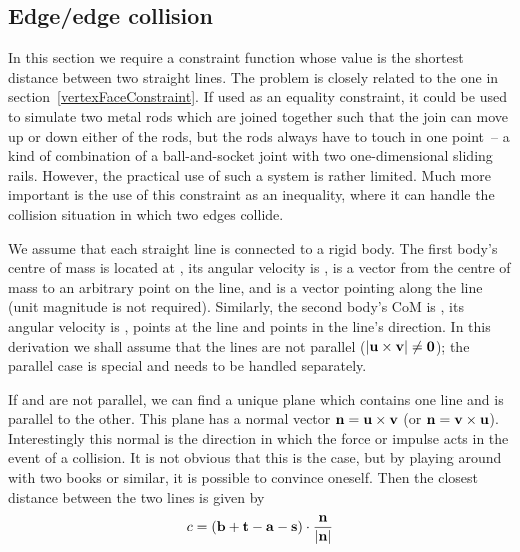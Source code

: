 \subsection{Edge/edge collision\label{edgeEdgeConstraint}}

In this section we require a constraint function whose value is the shortest distance between
two straight lines. The problem is closely related to the one in
section~\ref{vertexFaceConstraint}. If used as an equality constraint, it could be used to
simulate two metal rods which are joined together such that the join can move up or down either
of the rods, but the rods always have to touch in one point~-- a kind of combination of a
ball-and-socket joint with two one-dimensional sliding rails. However, the practical use of such
a system is rather limited. Much more important is the use of this constraint as an inequality,
where it can handle the collision situation in which two edges collide.

We assume that each straight line is connected to a rigid body. The first body's centre of mass
is located at , its angular velocity is \ve{\omega},  is a vector from the centre
of mass to an arbitrary point on the line, and  is a vector pointing along the line (unit
magnitude is not required). Similarly, the second body's CoM is , its angular velocity is
\ve{\phi},  points at the line and  points in the line's direction. In this
derivation we shall assume that the lines are not parallel
($\norm{\ve{u}\times\ve{v}} \ne \ve{0}$); the parallel case is special and needs to be handled
separately.

If  and  are not parallel, we can find a unique plane which contains one line and is
parallel to the other. This plane has a normal vector $\ve{n} = \ve{u}\times\ve{v}$ (or
$\ve{n} = \ve{v}\times\ve{u}$). Interestingly this normal is the direction in which the force or
impulse acts in the event of a collision. It is not obvious that this is the case, but by playing
around with two books or similar, it is possible to convince oneself. Then the closest distance
between the two lines is given by
\begin{equation}
c = (\ve{b} + \ve{t} - \ve{a} - \ve{s})\cdot\frac{\ve{n}}{\norm{\ve{n}}}
\end{equation}

